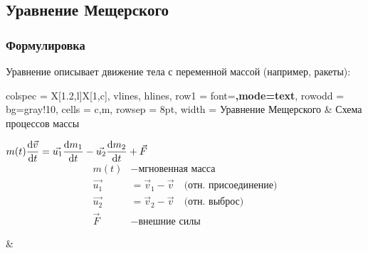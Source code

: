 \subsection{Уравнение Мещерского}

\subsubsection{Формулировка}
Уравнение описывает движение тела с переменной массой (например, ракеты):

\begin{center}
\begin{tblr}{
  colspec = {X[1.2,l]X[1,c]},
  vlines,
  hlines,
  row{1} = {font=\bfseries,mode=text},
  row{odd} = {bg=gray!10},
  cells = {c,m},
  rowsep = 8pt,
  width = \textwidth
}
Уравнение Мещерского & Схема процессов массы \\
\parbox{0.5\textwidth}{
\centering
\large
$m(t)\dfrac{\mathrm{d}\vec{v}}{\mathrm{d} t}=\vec{u_1}\dfrac{\mathrm{d} m_1}{\mathrm{d} t}-\vec{u_2}\dfrac{\mathrm{d} m_2}{\mathrm{d} t}+\vec{F}$ \\
\normalsize
\begin{align*}
m(t) &- \text{мгновенная масса} \\
\vec{u_1} &= \vec{v}_1 - \vec{v} \quad \text{(отн. присоединение)} \\
\vec{u_2} &= \vec{v}_2 - \vec{v} \quad \text{(отн. выброс)} \\
\vec{F} &- \text{внешние силы}
\end{align*}
}
&
\begin{minipage}[c]{\linewidth}
\centering
{}
\end{minipage}
\\
\end{tblr}
\end{center}

